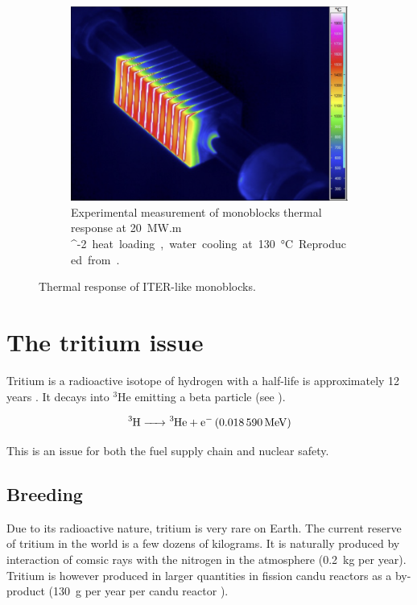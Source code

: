 \begin{figure} [h]
\begin{subfigure}[t]{0.45\linewidth}
            \includegraphics[width=\linewidth]{Figures/Chapter1/monoblock_experimental_temperature_field.png}
            \caption{Experimental measurement of monoblocks thermal response at \SI{20}{MW.m ^{-2}} heat loading, water cooling at \SI{130}{\celsius}. Reproduced from \cite{visca_manufacturing_2018}.}
    \end{subfigure}
    \caption{Thermal response of ITER-like monoblocks.}
\end{figure}

\section{The tritium issue} \label{the tritium issue}

Tritium is a radioactive \gls{isotope} of hydrogen with a half-life is approximately 12 years .
It decays into $^3$He emitting a beta particle (see ).

\begin{equation}
    \ce{^3H -> ^3He + e^- (\SI{0.018590}{MeV})}
    \labeq{tritium decay}
\end{equation}

This is an issue for both the fuel supply chain and nuclear safety.

\subsection{Breeding}
Due to its radioactive nature, tritium is very rare on Earth.
The current reserve of tritium in the world is a few dozens of kilograms.
It is naturally produced by interaction of comsic rays with the nitrogen in the atmosphere (\SI{0.2}{kg} per year).
Tritium is however produced in larger quantities in fission \gls{candu} reactors as a by-product (\SI{130}{g} per year per \gls{candu} reactor ).

